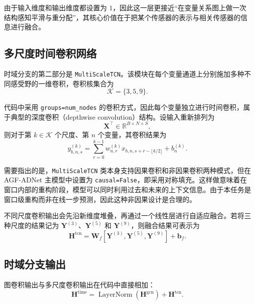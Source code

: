 由于输入维度和输出维度都设置为 $1$，因此这一层更接近“在变量关系图上做一次结构感知平滑与重分配”，其核心价值在于把某个传感器的表示与相关传感器的信息进行融合。

\subsection{多尺度时间卷积网络}

时域分支的第二部分是 \texttt{MultiScaleTCN}。该模块在每个变量通道上分别施加多种不同感受野的一维卷积，卷积核集合为
\begin{equation}
    \mathcal{K} = \{3,5,9\}.
\end{equation}

代码中采用 \texttt{groups=num\_nodes} 的卷积方式，因此每个变量独立进行时间卷积，属于典型的深度卷积（depthwise convolution）结构。设输入重新排列为
\begin{equation}
    \mathbf{X}^{\top} \in \mathbb{R}^{B \times N \times S},
\end{equation}
则对于第 $k \in \mathcal{K}$ 个尺度、第 $n$ 个变量，其卷积结果为
\begin{equation}
    y^{(k)}_{b,n,s}
    =
    \sum_{r=0}^{k-1}
    w^{(k)}_{n,r}
    x_{b,n,s+r-\lfloor k/2 \rfloor}
    + b^{(k)}_n.
\end{equation}

需要指出的是，\texttt{MultiScaleTCN} 类本身支持因果卷积和非因果卷积两种模式，但在 AGF-ADNet 主模型中设置为 \texttt{causal=False}，即采用对称填充。这样做意味着在窗口内部的重构阶段，模型可以同时利用过去和未来的上下文信息。由于本任务是窗口级重构而非在线一步预测，因此这种非因果设计是合理的。

不同尺度卷积输出会先沿新维度堆叠，再通过一个线性层进行自适应融合。若将三种尺度的结果记为 $\mathbf{Y}^{(3)}$、$\mathbf{Y}^{(5)}$ 和 $\mathbf{Y}^{(9)}$，则融合结果可表示为
\begin{equation}
    \mathbf{H}^{\mathrm{tcn}} =
    \mathbf{W}_f
    [\mathbf{Y}^{(3)}, \mathbf{Y}^{(5)}, \mathbf{Y}^{(9)}]
    + \mathbf{b}_f.
\end{equation}

\subsection{时域分支输出}

图卷积输出与多尺度卷积输出在代码中直接相加：
\begin{equation}
    \mathbf{H}^{\mathrm{time}} =
    \operatorname{LayerNorm}(\mathbf{H}^{\mathrm{gcn}})
    + \mathbf{H}^{\mathrm{tcn}}.
\end{equation}

